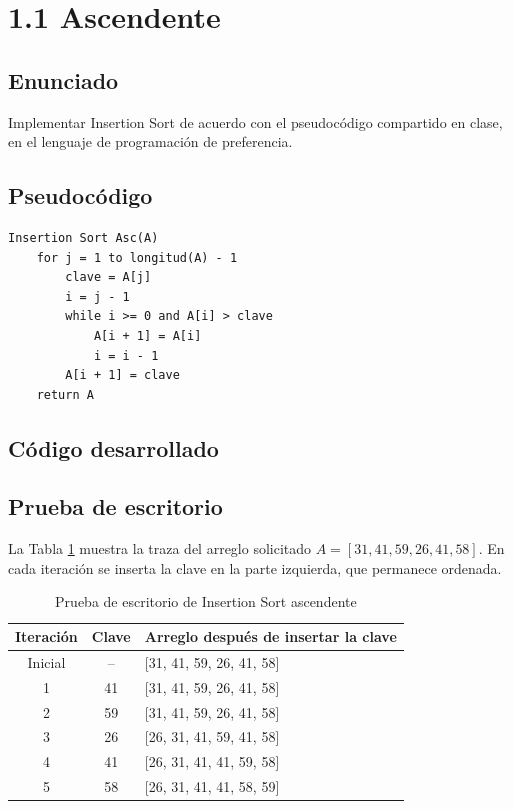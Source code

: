 \documentclass[12pt,letterpaper,oneside]{report}
\begin{document}
\section*{1.1 Ascendente}
\setcounter{section}{1}
\setcounter{subsection}{0}

\subsection{Enunciado}

Implementar Insertion Sort de acuerdo con el pseudocódigo compartido en clase,
en el lenguaje de programación de preferencia.

\subsection{Pseudocódigo}

\begin{lstlisting}[caption={Pseudocódigo de Insertion Sort Ascendente},label={pseudo:insertion-asc}]
Insertion Sort Asc(A)
    for j = 1 to longitud(A) - 1
        clave = A[j]
        i = j - 1
        while i >= 0 and A[i] > clave
            A[i + 1] = A[i]
            i = i - 1
        A[i + 1] = clave
    return A
\end{lstlisting}

\subsection{Código desarrollado}



\clearpage

\subsection{Prueba de escritorio}

La Tabla \ref{tab:prueba-escritorio} muestra la traza del arreglo solicitado
$A=[31,41,59,26,41,58]$. En cada iteración se inserta la clave en la parte
izquierda, que permanece ordenada.

\begin{table}[H]
\centering
\caption{Prueba de escritorio de Insertion Sort ascendente}
\label{tab:prueba-escritorio}

\begin{tabular}{c|c|l}
Iteración & Clave & Arreglo después de insertar la clave \\ \hline
Inicial & -- & [31, 41, 59, 26, 41, 58] \\
1 & 41 & [31, 41, 59, 26, 41, 58] \\
2 & 59 & [31, 41, 59, 26, 41, 58] \\
3 & 26 & [26, 31, 41, 59, 41, 58] \\
4 & 41 & [26, 31, 41, 41, 59, 58] \\
5 & 58 & [26, 31, 41, 41, 58, 59] \\
\end{tabular}
\end{table}
\end{document}
